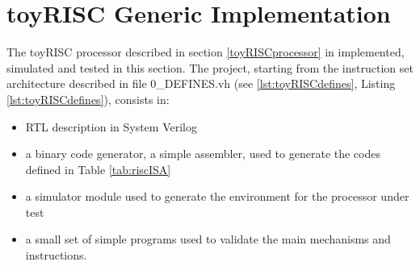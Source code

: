 \newpage

\section{toyRISC Generic Implementation}\label{toyRiscImpl}

The toyRISC processor described in section \ref{toyRISCprocessor} in implemented, simulated and tested in this section. The project, starting from the instruction set architecture described in file 0\_DEFINES.vh  (see \ref{lst:toyRISCdefines}, Listing \ref{lst:toyRISCdefines}), consists in:
\begin{itemize}
    \item RTL description in System Verilog
    \item a binary code generator, a simple assembler, used to generate the codes defined in Table \ref{tab:riscISA}
    \item a simulator module used to generate the environment for the processor under test
    \item a small set of simple programs used to validate the main mechanisms and instructions.
\end{itemize}

